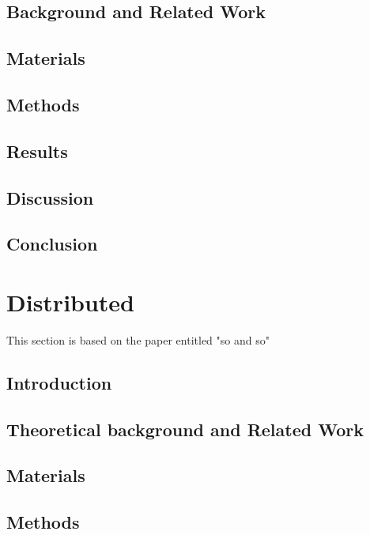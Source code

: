 \subsection{Background and Related Work}

\subsection{Materials}

\subsection{Methods}

\subsection{Results}

\subsection{Discussion}

\subsection{Conclusion}





\section{Distributed}\label{subsec:distributed}
This section is based on the paper entitled "so and so"

\subsection{Introduction}

\subsection{Theoretical background and Related Work}

\subsection{Materials}

\subsection{Methods}

